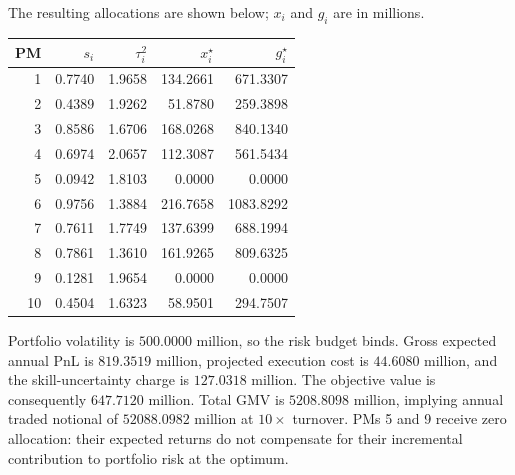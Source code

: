 \documentclass[11pt]{gappyarticle}
\begin{document}
The resulting allocations are shown below; $x_i$ and $g_i$ are in millions.
\begin{center}
\begin{tabular}{rrrrr}
\toprule
PM & $s_i$ & $\tau_i^2$ & $x_i^\star$ & $g_i^\star$ \\
\midrule
1 & 0.7740 & 1.9658 & 134.2661 & 671.3307 \\
2 & 0.4389 & 1.9262 & 51.8780 & 259.3898 \\
3 & 0.8586 & 1.6706 & 168.0268 & 840.1340 \\
4 & 0.6974 & 2.0657 & 112.3087 & 561.5434 \\
5 & 0.0942 & 1.8103 & 0.0000 & 0.0000 \\
6 & 0.9756 & 1.3884 & 216.7658 & 1083.8292 \\
7 & 0.7611 & 1.7749 & 137.6399 & 688.1994 \\
8 & 0.7861 & 1.3610 & 161.9265 & 809.6325 \\
9 & 0.1281 & 1.9654 & 0.0000 & 0.0000 \\
10 & 0.4504 & 1.6323 & 58.9501 & 294.7507 \\
\bottomrule
\end{tabular}
\end{center}
Portfolio volatility is $500.0000$ million, so the risk budget binds.
Gross expected annual PnL is $819.3519$ million, projected execution cost
is $44.6080$ million, and the skill-uncertainty charge is $127.0318$ million.
The objective value is consequently $647.7120$ million.
Total GMV is $5208.8098$ million, implying annual traded notional
of $52088.0982$ million at $10\times$ turnover.
PMs 5 and 9 receive zero allocation: their expected returns do not compensate
for their incremental contribution to portfolio risk at the optimum.
\end{document}
